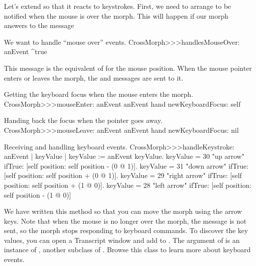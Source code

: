 \documentclass[a4paper,10pt,twoside]{book}
\begin{document}
Let's extend  so that it reacts to keystrokes.
First, we need to arrange to be notified when the mouse is over the morph.
This will happen if our morph answers  to the  message

\begin{method}{We want to handle ``mouse over'' events.} 
CrossMorph>>>handlesMouseOver: anEvent
	^true
\end{method}

\noindent
This message is the equivalent of  for the mouse position.
When the mouse pointer enters or leaves the morph, the  and  messages are sent to it.

\begin{method}{Getting the keyboard focus when the mouse enters the morph.}
CrossMorph>>>mouseEnter: anEvent
	anEvent hand newKeyboardFocus: self
\end{method}

\begin{method}{Handing back the focus when the pointer goes away.}
CrossMorph>>>mouseLeave: anEvent
	anEvent hand newKeyboardFocus: nil
\end{method}

\begin{method}[handleKeystroke]{Receiving and handling keyboard events.}
CrossMorph>>>handleKeystroke: anEvent
	| keyValue |
	keyValue := anEvent keyValue.
	keyValue = 30	 "up arrow"
		ifTrue: [self position: self position - (0 @ 1)].
	keyValue = 31	 "down arrow"
		ifTrue: [self position: self position + (0 @ 1)].
	keyValue = 29	 "right arrow"
		ifTrue: [self position: self position + (1 @ 0)].
	keyValue = 28	 "left arrow"
		ifTrue: [self position: self position - (1 @ 0)]
\end{method}

We have written this method so that you can move the morph using the arrow keys.
Note that when the mouse is no longer over the morph, the  message is not sent, so the morph stops responding to keyboard commands.
To discover the key values, you can open a Transcript window and add   to .
The  argument of  is an instance of , another subclass of . Browse this class to learn more about keyboard events.
\end{document}
